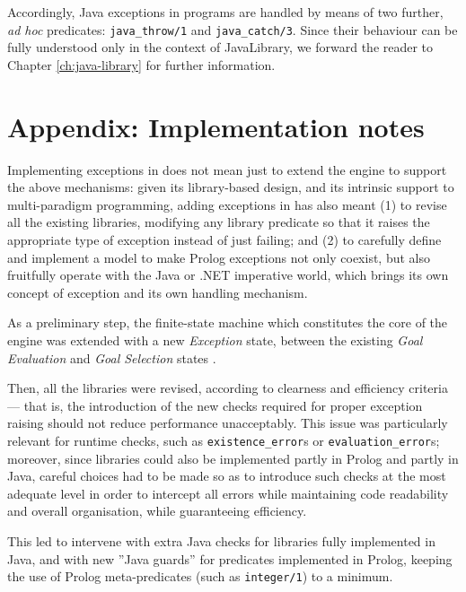 \noindent Accordingly, Java exceptions in \tuprolog{} programs are handled by means of two further, \textit{ad hoc} predicates: \texttt{java\_throw/1} and \texttt{java\_catch/3}.
%
Since their behaviour can be fully understood only in the context of JavaLibrary, we forward the reader to Chapter \ref{ch:java-library} for further information.

\section{Appendix: Implementation notes}

Implementing exceptions in \tuprolog{} does not mean just to extend the engine to support the above mechanisms: given its library-based design, and its intrinsic support to multi-paradigm programming, adding exceptions in \tuprolog{} has also meant (1) to revise all the existing libraries, modifying any library predicate so that it raises the appropriate type of exception instead of just failing; and (2) to carefully define and implement a model to make Prolog exceptions not only coexist, but also fruitfully operate with the Java or .NET imperative world, which brings its own concept of exception and its own handling mechanism.

As a preliminary step, the finite-state machine which constitutes the core of the \tuprolog{} engine was extended with a new \textit{Exception} state, between the existing \textit{Goal Evaluation} and \textit{Goal Selection} states \cite{iuliani-masterthesis-2009}.

Then, all the \tuprolog{} libraries were revised, according to clearness and efficiency criteria --- that is, the introduction of the new checks required for proper exception raising should not reduce performance unacceptably. This issue was particularly relevant for runtime checks, such as \texttt{existence\_error}s or \texttt{evaluation\_error}s; moreover, since \tuprolog{} libraries could also be implemented partly in Prolog and partly in Java, careful choices had to be made so as to introduce such checks at the most adequate level in order to intercept all errors while maintaining code readability and overall organisation, while guaranteeing efficiency.

This led to intervene with extra Java checks for libraries fully implemented in Java, and with new ''Java guards'' for predicates implemented in Prolog, keeping the use of Prolog meta-predicates (such as \texttt{integer/1}) to a minimum.

